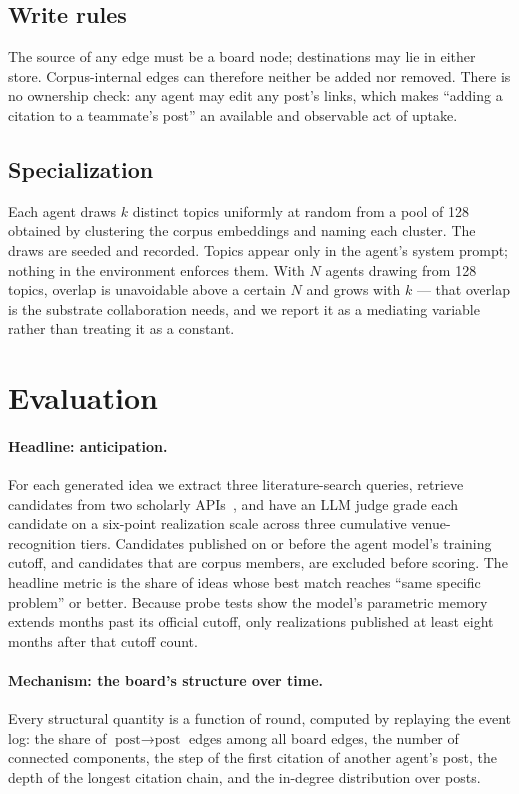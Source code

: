 \documentclass[sigconf,anonymous]{aamas}
\begin{document}
\subsection{Write rules}

The source of any edge must be a board node; destinations may lie in either
store. Corpus-internal edges can therefore neither be added nor removed. There
is no ownership check: any agent may edit any post's links, which makes
``adding a citation to a teammate's post'' an available and observable act of
uptake.

\subsection{Specialization}

Each agent draws $k$ distinct topics uniformly at random from a pool of 128
obtained by clustering the corpus embeddings and naming each cluster. The draws
are seeded and recorded. Topics appear only in the agent's system prompt;
nothing in the environment enforces them. With $N$ agents drawing from 128
topics, overlap is unavoidable above a certain $N$ and grows with $k$ --- that
overlap is the substrate collaboration needs, and we report it as a mediating
variable rather than treating it as a constant.

\section{Evaluation}
\label{sec:eval}

\paragraph{Headline: anticipation.}
For each generated idea we extract three literature-search queries, retrieve
candidates from two scholarly APIs~\cite{kinney2023s2,priem2022openalex}, and
have an LLM judge grade each candidate on a six-point realization scale across
three cumulative venue-recognition tiers. Candidates published on or before the
agent model's training cutoff, and candidates that are corpus members, are
excluded before scoring. The headline metric is the share of ideas whose best
match reaches ``same specific problem'' or better. Because probe tests show the
model's parametric memory extends months past its official cutoff, only
realizations published at least eight months after that cutoff count.

\paragraph{Mechanism: the board's structure over time.}
Every structural quantity is a function of round, computed by replaying the
event log: the share of $\text{post}\to\text{post}$ edges among all board
edges, the number of connected components, the step of the first citation of
another agent's post, the depth of the longest citation chain, and the
in-degree distribution over posts.
\end{document}
